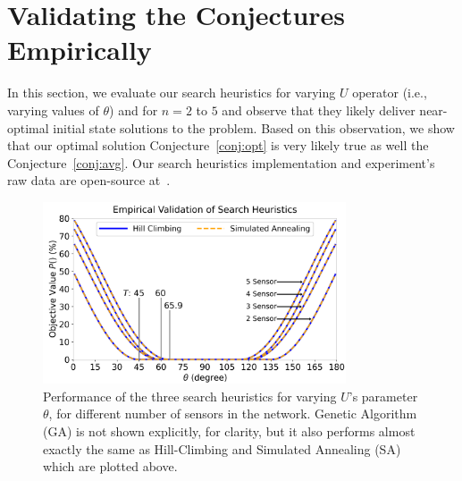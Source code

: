 \section{Validating the Conjectures Empirically}
\label{sec:sim}

In this section, we evaluate our search heuristics for varying $U$ operator (i.e., varying values of $\theta$) and for $n = 2$ to $5$ and observe that they likely deliver
near-optimal initial state solutions to the \iso problem. 
Based on this observation, we show that our optimal solution Conjecture~\ref{conj:opt} is very
likely true as well the Conjecture~\ref{conj:avg}.
Our search heuristics implementation and 
experiment's raw data are open-source at~\cite{iso-code}.



\begin{figure}
    \centering
    \includegraphics[width=0.8\textwidth]{chapters/tqc/figures/varying_theta_nsensors.png}
    \caption{Performance of the three search heuristics for varying $U$'s parameter $\theta$, for different number of sensors in the network. Genetic Algorithm (GA) is not shown explicitly, for clarity, but it also performs almost exactly the same as Hill-Climbing and Simulated Annealing (SA) which are plotted above.}
    \label{fig:heuristics}
\end{figure}


